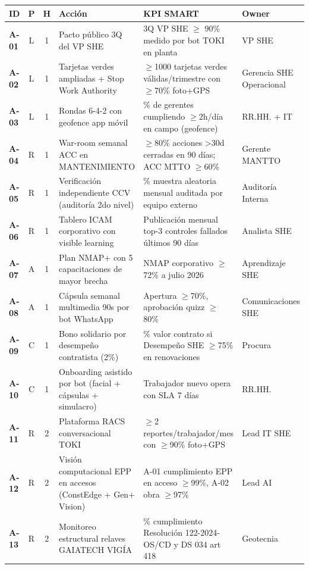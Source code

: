 \begingroup\footnotesize
\setlength{\tabcolsep}{3pt}
\renewcommand{\arraystretch}{1.0}
\begin{longtable}{@{}>{\bfseries}p{0.55cm} c c >{\raggedright\arraybackslash}p{5.6cm} >{\raggedright\arraybackslash}p{4.8cm} >{\raggedright\arraybackslash}p{2.6cm}@{}}
\toprule
\textbf{ID} & \textbf{P} & \textbf{H} & \textbf{Acción} & \textbf{KPI SMART} & \textbf{Owner} \\
\midrule
\endhead
A-01 & L & 1 & Pacto público 3Q del VP SHE & 3Q VP SHE $\geq$ 90\% medido por bot TOKI en planta & VP SHE \\
A-02 & L & 1 & Tarjetas verdes ampliadas + Stop Work Authority & $\geq$1000 tarjetas verdes válidas/trimestre con $\geq$70\% foto+GPS & Gerencia SHE Operacional \\
A-03 & L & 1 & Rondas 6-4-2 con geofence app móvil & 95\% de gerentes cumpliendo $\geq$2h/día en campo (geofence) & RR.HH. + IT \\
A-04 & R & 1 & War-room semanal ACC en MANTENIMIENTO & $\geq$80\% acciones >30d cerradas en 90 días; ACC MTTO $\geq$60\% & Gerente MANTTO \\
A-05 & R & 1 & Verificación independiente CCV (auditoría 2do nivel) & 5\% muestra aleatoria mensual auditada por equipo externo & Auditoría Interna \\
A-06 & R & 1 & Tablero ICAM corporativo con visible learning & Publicación mensual top-3 controles fallados últimos 90 días & Analista SHE \\
A-07 & A & 1 & Plan NMAP+ con 5 capacitaciones de mayor brecha & NMAP corporativo $\geq$72\% a julio 2026 & Aprendizaje SHE \\
A-08 & A & 1 & Cápsula semanal multimedia 90s por bot WhatsApp & Apertura $\geq$70\%, aprobación quizz $\geq$80\% & Comunicaciones SHE \\
A-09 & C & 1 & Bono solidario por desempeño contratista (2\%) & 2\% valor contrato si Desempeño SHE $\geq$75\% en renovaciones & Procura \\
A-10 & C & 1 & Onboarding asistido por bot (facial + cápsulas + simulacro) & Trabajador nuevo opera con SLA 7 días & RR.HH. \\
A-11 & R & 2 & Plataforma RACS conversacional TOKI & $\geq$2 reportes/trabajador/mes con $\geq$90\% foto+GPS & Lead IT SHE \\
A-12 & R & 2 & Visión computacional EPP en accesos (ConstEdge + Gen+ Vision) & A-01 cumplimiento EPP en acceso $\geq$99\%, A-02 obra $\geq$97\% & Lead AI \\
A-13 & R & 2 & Monitoreo estructural relaves GAIATECH VIGÍA & 100\% cumplimiento Resolución 122-2024-OS/CD y DS 034 art 418 & Geotecnia \\

\end{longtable}
